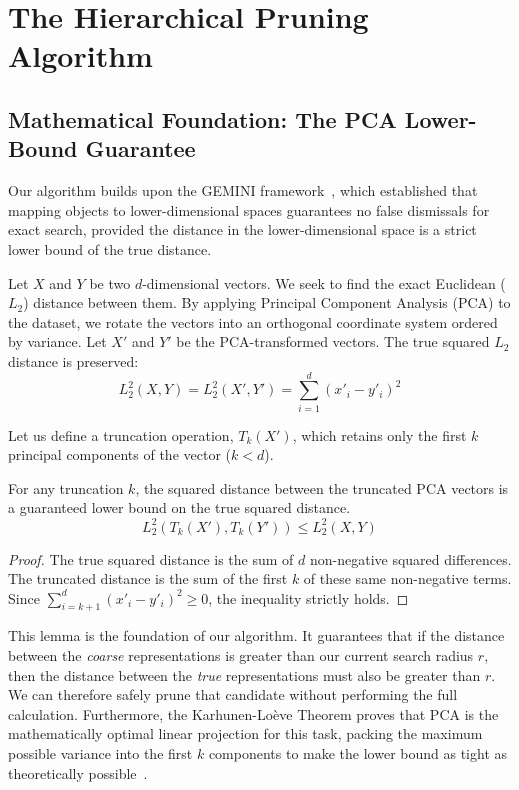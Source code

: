\documentclass[sigconf,nonacm]{acmart}
\begin{document}
\section{The Hierarchical Pruning Algorithm}

\subsection{Mathematical Foundation: The PCA Lower-Bound Guarantee}

Our algorithm builds upon the GEMINI framework~\cite{faloutsos1994fast}, which established that mapping objects to lower-dimensional spaces guarantees no false dismissals for exact search, provided the distance in the lower-dimensional space is a strict lower bound of the true distance.

Let $X$ and $Y$ be two $d$-dimensional vectors. We seek to find the exact Euclidean ($L_2$) distance between them. By applying Principal Component Analysis (PCA) to the dataset, we rotate the vectors into an orthogonal coordinate system ordered by variance. Let $X'$ and $Y'$ be the PCA-transformed vectors. The true squared $L_2$ distance is preserved:
\begin{equation}
    L_2^2(X, Y) = L_2^2(X', Y') = \sum_{i=1}^{d} (x'_i - y'_i)^2
\end{equation}

Let us define a truncation operation, $T_k(X')$, which retains only the first $k$ principal components of the vector ($k < d$).

\begin{lemma}
For any truncation $k$, the squared distance between the truncated PCA vectors is a guaranteed lower bound on the true squared distance.
\begin{equation}
    L_2^2(T_k(X'), T_k(Y')) \leq L_2^2(X, Y)
\end{equation}
\end{lemma}

\begin{proof}
The true squared distance is the sum of $d$ non-negative squared differences. The truncated distance is the sum of the first $k$ of these same non-negative terms. Since $\sum_{i=k+1}^{d} (x'_i - y'_i)^2 \geq 0$, the inequality strictly holds.
\end{proof}

This lemma is the foundation of our algorithm. It guarantees that if the distance between the \textit{coarse} representations is greater than our current search radius $r$, then the distance between the \textit{true} representations must also be greater than $r$. We can therefore safely prune that candidate without performing the full calculation. Furthermore, the Karhunen-Loève Theorem proves that PCA is the mathematically optimal linear projection for this task, packing the maximum possible variance into the first $k$ components to make the lower bound as tight as theoretically possible~\cite{weber1998quantitative}.
\end{document}
